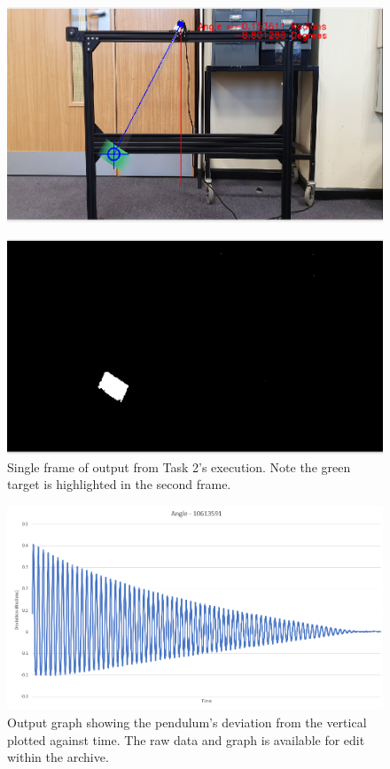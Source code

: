 \documentclass[conference]{IEEEtran}
\begin{document}
\begin{figure}[H]
\centering
\includegraphics[width=5in]{t2_output2}
\end{figure}
\begin{figure}[H]
\centering
\includegraphics[width=5in]{t2_output3}
\caption{Single frame of output from Task 2's execution. Note the green target is highlighted in the second frame.}
\label{fig_t2output}
\end{figure}

\begin{figure}[H]
\centering
\includegraphics[width=5in]{t2_graph}
\caption{Output graph showing the pendulum's deviation from the vertical plotted against time. The raw data and graph is available for edit within the archive.}
\label{fig_t2graph}
\end{figure}
\end{document}
